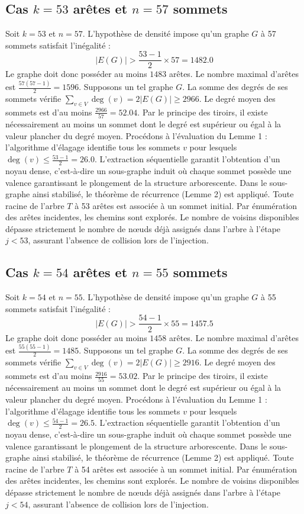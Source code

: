 \documentclass[12pt,a4paper]{article}
\begin{document}
\subsection{Cas $k = 53$ arêtes et $n = 57$ sommets}
Soit $k = 53$ et $n = 57$. L'hypothèse de densité impose qu'un graphe $G$ à 57 sommets satisfait l'inégalité :
$$ |E(G)| > \frac{53-1}{2} \times 57 = 1482.0 $$
Le graphe doit donc posséder au moins $1483$ arêtes. Le nombre maximal d'arêtes est $\frac{57(57-1)}{2} = 1596$.
Supposons un tel graphe $G$. La somme des degrés de ses sommets vérifie $\sum_{v \in V} \deg(v) = 2|E(G)| \geq 2966$.
Le degré moyen des sommets est d'au moins $\frac{2966}{57} = 52.04$.
Par le principe des tiroirs, il existe nécessairement au moins un sommet dont le degré est supérieur ou égal à la valeur plancher du degré moyen.
Procédons à l'évaluation du Lemme 1 : l'algorithme d'élagage identifie tous les sommets $v$ pour lesquels $\deg(v) \leq \frac{53-1}{2} = 26.0$.
L'extraction séquentielle garantit l'obtention d'un noyau dense, c'est-à-dire un sous-graphe induit où chaque sommet possède une valence garantissant le plongement de la structure arborescente.
Dans le sous-graphe ainsi stabilisé, le théorème de récurrence (Lemme 2) est appliqué. Toute racine de l'arbre $T$ à 53 arêtes est associée à un sommet initial. Par énumération des arêtes incidentes, les chemins sont explorés. Le nombre de voisins disponibles dépasse strictement le nombre de nœuds déjà assignés dans l'arbre à l'étape $j < 53$, assurant l'absence de collision lors de l'injection.

\subsection{Cas $k = 54$ arêtes et $n = 55$ sommets}
Soit $k = 54$ et $n = 55$. L'hypothèse de densité impose qu'un graphe $G$ à 55 sommets satisfait l'inégalité :
$$ |E(G)| > \frac{54-1}{2} \times 55 = 1457.5 $$
Le graphe doit donc posséder au moins $1458$ arêtes. Le nombre maximal d'arêtes est $\frac{55(55-1)}{2} = 1485$.
Supposons un tel graphe $G$. La somme des degrés de ses sommets vérifie $\sum_{v \in V} \deg(v) = 2|E(G)| \geq 2916$.
Le degré moyen des sommets est d'au moins $\frac{2916}{55} = 53.02$.
Par le principe des tiroirs, il existe nécessairement au moins un sommet dont le degré est supérieur ou égal à la valeur plancher du degré moyen.
Procédons à l'évaluation du Lemme 1 : l'algorithme d'élagage identifie tous les sommets $v$ pour lesquels $\deg(v) \leq \frac{54-1}{2} = 26.5$.
L'extraction séquentielle garantit l'obtention d'un noyau dense, c'est-à-dire un sous-graphe induit où chaque sommet possède une valence garantissant le plongement de la structure arborescente.
Dans le sous-graphe ainsi stabilisé, le théorème de récurrence (Lemme 2) est appliqué. Toute racine de l'arbre $T$ à 54 arêtes est associée à un sommet initial. Par énumération des arêtes incidentes, les chemins sont explorés. Le nombre de voisins disponibles dépasse strictement le nombre de nœuds déjà assignés dans l'arbre à l'étape $j < 54$, assurant l'absence de collision lors de l'injection.
\end{document}
